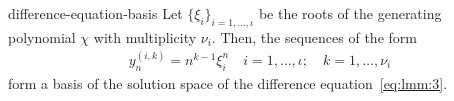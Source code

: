 \begin{Theorem}{difference-equation-basis}
  Let $\{\xi_i\}_{i=1,\dots,\iota}$ be the roots of the
  generating polynomial $\chi$ with multiplicity $\nu_i$. Then,
  the sequences of the form
  \begin{gather}
    \label{eq:lmm:6}
    y^{(i,k)}_n = n^{k-1}\xi_i^n
    \quad i=1,\dots,\iota; \quad k = 1,\dots,\nu_i
  \end{gather}
  form a basis of the solution space of the difference
  equation~\eqref{eq:lmm:3}.
\end{Theorem}


